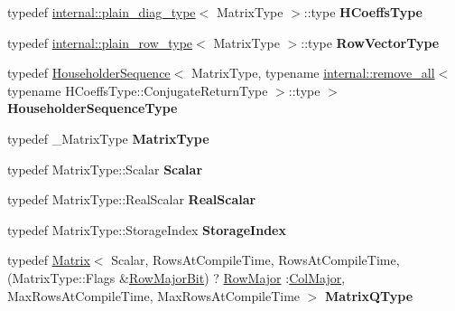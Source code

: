 \begin{DoxyCompactItemize}
\item 
\mbox{\label{group___q_r___module_a9262c3ac9ce88401189952feffeedade}} 
typedef \hyperlink{struct_eigen_1_1internal_1_1plain__diag__type}{internal\+::plain\+\_\+diag\+\_\+type}$<$ Matrix\+Type $>$\+::type {\bfseries H\+Coeffs\+Type}
\item 
\mbox{\label{group___q_r___module_aef2e07eccf00487740690992eba6530a}} 
typedef \hyperlink{struct_eigen_1_1internal_1_1plain__row__type}{internal\+::plain\+\_\+row\+\_\+type}$<$ Matrix\+Type $>$\+::type {\bfseries Row\+Vector\+Type}
\item 
\mbox{\label{group___q_r___module_a3c0de7c71cdf19f7805bf5c43df0ec4a}} 
typedef \hyperlink{group___householder___module_class_eigen_1_1_householder_sequence}{Householder\+Sequence}$<$ Matrix\+Type, typename \hyperlink{struct_eigen_1_1internal_1_1remove__all}{internal\+::remove\+\_\+all}$<$ typename H\+Coeffs\+Type\+::\+Conjugate\+Return\+Type $>$\+::type $>$ {\bfseries Householder\+Sequence\+Type}
\item 
\mbox{\label{group___q_r___module_a134120663d098b19d0850c8b8277f0bf}} 
typedef \+\_\+\+Matrix\+Type {\bfseries Matrix\+Type}
\item 
\mbox{\label{group___q_r___module_a5dce09a1ce29ead94f3eae883ee2eaa0}} 
typedef Matrix\+Type\+::\+Scalar {\bfseries Scalar}
\item 
\mbox{\label{group___q_r___module_a153982d3df67aedc48bfe046d6677a69}} 
typedef Matrix\+Type\+::\+Real\+Scalar {\bfseries Real\+Scalar}
\item 
\mbox{\label{group___q_r___module_a099bd13f10d30af75c88657096870343}} 
typedef Matrix\+Type\+::\+Storage\+Index {\bfseries Storage\+Index}
\item 
\mbox{\label{group___q_r___module_a6f384954ee6154168ee979d23f43930a}} 
typedef \hyperlink{group___core___module_class_eigen_1_1_matrix}{Matrix}$<$ Scalar, Rows\+At\+Compile\+Time, Rows\+At\+Compile\+Time,(Matrix\+Type\+::\+Flags \&\hyperlink{group__flags_gae4f56c2a60bbe4bd2e44c5b19cbe8762}{Row\+Major\+Bit}) ? \hyperlink{group__enums_ggaacded1a18ae58b0f554751f6cdf9eb13acfcde9cd8677c5f7caf6bd603666aae3}{Row\+Major} \+:\hyperlink{group__enums_ggaacded1a18ae58b0f554751f6cdf9eb13a0cbd4bdd0abcfc0224c5fcb5e4f6669a}{Col\+Major}, Max\+Rows\+At\+Compile\+Time, Max\+Rows\+At\+Compile\+Time $>$ {\bfseries Matrix\+Q\+Type}

\end{DoxyCompactItemize}
